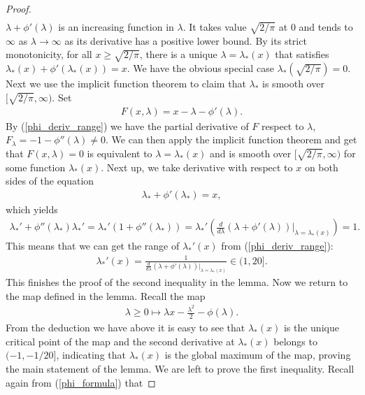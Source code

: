 \documentclass[10pt]{article}
\newenvironment{Proof of lemma}{\noindent{\bf Proof of Lemma}}{\hfill$\Box$\newline}
\newenvironment{Proof of claim}{\noindent{\bf Proof of claim}}{\hfill$\Box$\newline}
\newenvironment{Proof of theorem}{\noindent{\bf Proof of Theorem}}{\hfill\scriptsize{$\Box$}\newline}
\newenvironment{Proof of theorems}{\noindent{\bf Proof of Theorems}}{\hfill$\Box$\newline}
\newenvironment{Proof of proposition}{\noindent{\bf Proof of Proposition}}{\hfill$\Box$\newline}
\newenvironment{Proof of propositions}{\noindent{\bf Proof of Propositions}}{\hfill$\Box$\newline}
\newenvironment{Proof of exercise}{\noindent{\it Proof of Exercise:}}{\hfill$\Box$}
\numberwithin{equation}{section}
\begin{document}
\begin{proof}
\begin{align}
    \end{align}
    $\lambda + \phi'(\lambda)$ is an increasing function in $\lambda$. It takes value $\sqrt{2/\pi}$ at 0 and tends to $\infty$ as $\lambda \to \infty$ as its derivative has a positive lower bound. By its strict monotonicity, for all $x \geq \sqrt{2/\pi}$, there is a unique $\lambda = \lambda_*(x)$ that satisfies $\lambda_*(x) + \phi'(\lambda_*(x)) = x$. We have the obvious special case $\lambda_*(\sqrt{2/\pi})=0$. Next we use the implicit function theorem to claim that $\lambda_*$ is smooth over $[\sqrt{2/\pi},\infty)$. Set
    \begin{align}
        F(x,\lambda) = x - \lambda - \phi'(\lambda).
    \end{align}
        By (\ref{phi_deriv_range}) we have the partial derivative of $F$ respect to $\lambda$, $F_{\lambda} = -1 - \phi''(\lambda) \neq 0$. We can then apply the implicit function theorem and get that $F(x,\lambda) = 0$ is equivalent to $\lambda = \lambda_*(x)$ and is smooth over $[\sqrt{2/\pi},\infty)$ for some function $\lambda_*(x)$. Next up, we take derivative with respect to $x$ on both sides of the equation
        \begin{align}
            \lambda_* + \phi'(\lambda_*) = x,
        \end{align}
        which yields
        \begin{align} \label{fixing_lemma_helper1}
            \lambda_*'+\phi''(\lambda_*) \lambda_*' = \lambda_*'(1+\phi''(\lambda_*)) = \lambda_*'\left(\frac{d}{d \lambda}(\lambda + \phi'(\lambda))|_{\lambda = \lambda_*(x)}\right) = 1.
        \end{align}
        This means that we can get the range of $\lambda_*'(x)$ from (\ref{phi_deriv_range}):
        \begin{align}
            \lambda_*'(x) = \frac{1}{\frac{d}{d \lambda}(\lambda + \phi'(\lambda))|_{\lambda = \lambda_*(x)}} \in (1,20].
        \end{align}
        This finishes the proof of the second inequality in the lemma.
        Now we return to the map defined in the lemma. Recall the map
        \begin{align}
            \lambda \geq 0 \mapsto \lambda x -\frac{\lambda^2}{2} - \phi(\lambda).
        \end{align}
        From the deduction we have above it is easy to see that $\lambda_*(x)$ is the unique critical point of the map and the second derivative at $\lambda_*(x)$ belongs to $(-1,-1/20]$, indicating that $\lambda_*(x)$ is the global maximum of the map, proving the main statement of the lemma. We are left to prove the first inequality. Recall again from (\ref{phi_formula}) that

\end{proof}
\end{document}
